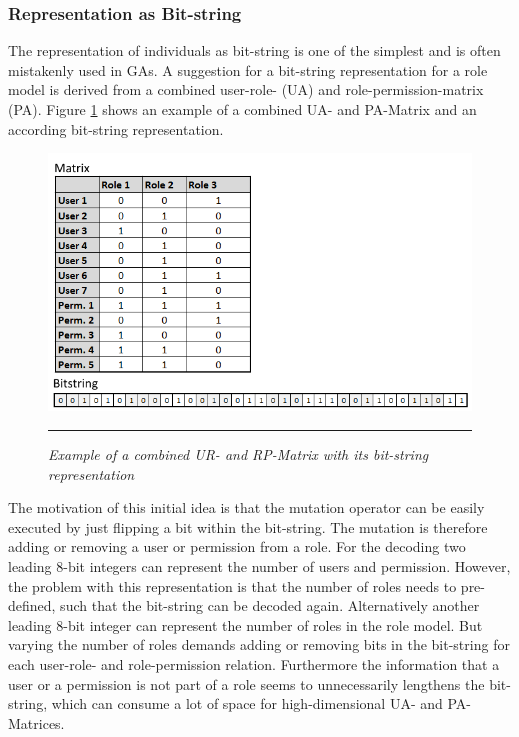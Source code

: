         \subsubsection{Representation as Bit-string}
        The representation of individuals as bit-string is one of the simplest and is often mistakenly used in GAs\cite{Eiben}. A suggestion for a bit-string representation for a role model is derived from a combined user-role- (UA) and role-permission-matrix (PA). Figure \ref{fig:representation1} shows an example of a combined UA- and PA-Matrix and an according bit-string representation.
        \begin{figure}
            \centering
            \includegraphics[scale=0.75]{./Figures/Representation1.png}
            \rule{20em}{0.5pt}
            \caption{\textit{Example of a combined UR- and RP-Matrix with its bit-string representation}}
            \label{fig:representation1}
        \end{figure}
        The motivation of this initial idea is that the mutation operator can be easily executed by just flipping a bit within the bit-string. The mutation is therefore adding or removing a user or permission from a role. For the decoding two leading 8-bit integers can represent the number of users and permission. However, the problem with this representation is that the number of roles needs to pre-defined, such that the bit-string can be decoded again. Alternatively another leading 8-bit integer can represent the number of roles in the role model. But varying the number of roles demands adding or removing bits in the bit-string for each user-role- and role-permission relation. Furthermore the information that a user or a permission is not part of a role seems to unnecessarily lengthens the bit-string, which can consume a lot of space for high-dimensional UA- and PA-Matrices.
